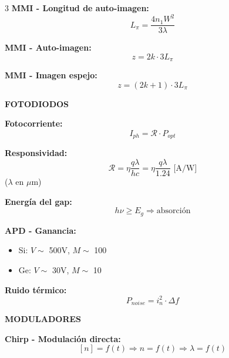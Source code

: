 \documentclass[10pt,a4paper,landscape]{article}
\newcommand{\secbox}[1]{\colorbox{blue!20}{\textbf{#1}}}
\begin{document}
\begin{multicols}{3}
\textbf{MMI - Longitud de auto-imagen:}
\begin{equation*}
\boxed{L_\pi = \frac{4n_1 W^2}{3\lambda}}
\end{equation*}

\textbf{MMI - Auto-imagen:}
\begin{equation*}
\boxed{z = 2k \cdot 3L_\pi}
\end{equation*}

\textbf{MMI - Imagen espejo:}
\begin{equation*}
\boxed{z = (2k+1) \cdot 3L_\pi}
\end{equation*}

\secbox{FOTODIODOS}

\textbf{Fotocorriente:}
\begin{equation*}
\boxed{I_{ph} = \mathcal{R} \cdot P_{opt}}
\end{equation*}

\textbf{Responsividad:}
\begin{equation*}
\boxed{\mathcal{R} = \eta \frac{q\lambda}{hc} = \eta \frac{q\lambda}{1.24} \text{ [A/W]}}
\end{equation*}
($\lambda$ en $\mu$m)

\textbf{Energía del gap:}
\begin{equation*}
\boxed{h\nu \geq E_g \Rightarrow \text{absorción}}
\end{equation*}

\textbf{APD - Ganancia:}
\begin{itemize}
\item Si: $V \sim$ 500V, $M \sim$ 100
\item Ge: $V \sim$ 30V, $M \sim$ 10
\end{itemize}

\textbf{Ruido térmico:}
\begin{equation*}
\boxed{P_{noise} = i_n^2 \cdot \Delta f}
\end{equation*}

\secbox{MODULADORES}

\textbf{Chirp - Modulación directa:}
\begin{equation*}
\boxed{[n] = f(t) \Rightarrow n = f(t) \Rightarrow \lambda = f(t)}
\end{equation*}


\end{multicols}
\end{document}
